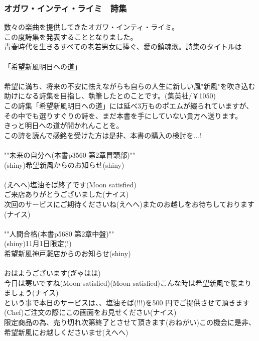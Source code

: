 \subsubsection{オガワ・インティ・ライミ　詩集}
数々の楽曲を提供してきたオガワ・インティ・ライミ。\\
この度詩集を発表することとなりました。\\
青春時代を生きるすべての老若男女に捧ぐ、愛の鎮魂歌。詩集のタイトルは\\
　\\
「希望新風明日への道」\\
　\\
希望に満ち、将来の不安に怯えながらも自らの人生に新しい風"新風"を吹き込む助けになる詩集を目指し、執筆したとのことです。(集英社/￥1050)\\
この詩集「希望新風明日への道」には延べ3万ものポエムが綴られていますが、その中でも選りすぐりの詩を、まだ本書を手にしていない貴方へ送ります。\\
きっと明日への道が開かれんことを。\\
この詩を読んで感銘を受けた方は是非、本書の購入の検討を...!\\
　\\
""未来の自分へ(本書p3560  第2章冒頭部)""\\
(shiny)希望新風からのお知らせ(shiny)\\
　\\
(えへへ)塩油そば終了です(Moon satisfied)\\
ご来店ありがとうございました(ナイス)\\
次回のサービスにご期待くださいね(えへへ)またのお越しをお待ちしております(ナイス)\\
　\\
""人間合格(本書p5680  第2章中盤)""\\
(shiny)11月1日限定(!)\\
希望新風神戸灘店からのお知らせ(shiny)\\
　\\
おはようございます(ぎゃはは)\\
今日は寒いですね(Moon satisfied)(Moon satisfied)こんな時は希望新風で暖まりましょう(ナイス)\\
という事で本日のサービスは、、塩油そば(!!!)を500 円でご提供させて頂きます(Chef)ご注文の際にこの画面をお見せください(ナイス)\\
限定商品の為、売り切れ次第終了とさせて頂きます(おねがい)この機会に是非、希望新風にお越しくださいませ(えへへ)\\

